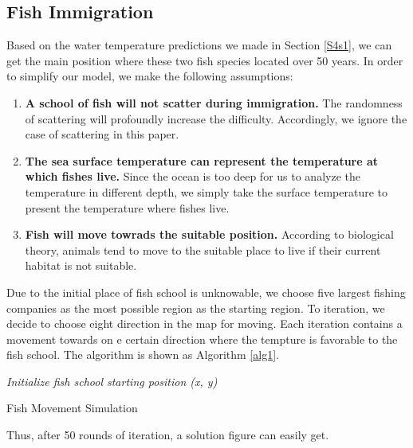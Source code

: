 \documentclass{mcmthesis}
\begin{document}
\subsection{Fish Immigration}\label{S4s2}
	Based on the water temperature predictions we made in Section \ref{S4s1}, we can get the main position where these two fish species located over 50 years. In order to simplify our model, we make the following assumptions:
\begin{enumerate}[1)]
	\item {\bfseries A school of fish will not scatter during immigration.} The randomness of scattering will profoundly increase the difficulty. Accordingly, we ignore the case of scattering in this paper.
	\item {\bfseries The sea surface temperature can represent the temperature at which fishes live.} Since the ocean is too deep for us to analyze the temperature in different depth, we simply take the surface temperature to present the temperature where fishes live.
	\item {\bfseries Fish will move towrads the suitable position.} According to biological theory, animals tend to move to the suitable place to live if their current habitat is not suitable.
\end{enumerate}	\par
	 Due to the initial place of fish school is unknowable, we choose five largest fishing companies as the most possible region as the starting region. To iteration, we decide to choose eight direction in the map for moving. Each iteration contains a movement towards on e certain direction where the tempture is favorable to the fish school. The algorithm is shown as Algorithm \ref{alg1}.\par

\IncMargin{1em}
\begin{algorithm}
\BlankLine
\emph{Initialize fish school starting position (x, y)}\;
\caption{Fish Movement Simulation}\label{alg1}
\end{algorithm}\DecMargin{1em}\par
	Thus, after 50 rounds of iteration, a solution figure can easily get.\par 
\end{document}
